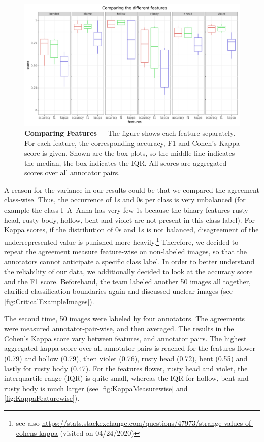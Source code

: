 \begin{figure}[!ht]
    \centering
    \includegraphics[scale=0.55]{Figures/chapter03/kappa_featurewise.png}
    \decoRule
    \caption[Feature-Wise Comparison of Agreement Measure Scores]{\textbf{Comparing Features}~~~The figure shows each feature separately. For each feature, the corresponding accuracy, F1 and Cohen’s Kappa score is given. Shown are the box-plots, so the middle line indicates the median, the box indicates the IQR. All scores are aggregated scores over all annotator pairs.}
    \label{fig:KappaFeaturewise}
\end{figure}

A reason for the variance in our results could be that we compared the agreement class-wise. Thus, the occurrence of 1s and 0s per class is very unbalanced (for example the class I~A~Anna has very few 1s because the binary features rusty head, rusty body, hollow, bent and violet are not present in this class label). For Kappa scores, if the distribution of 0s and 1s is not balanced, disagreement of the underrepresented value is punished more heavily.\footnote{see also \url{https://stats.stackexchange.com/questions/47973/strange-values-of-cohens-kappa} (visited on 04/24/2020)} Therefore, we decided to repeat the agreement measure feature-wise on non-labeled images, so that the annotators cannot anticipate a specific class label. In order to better understand the reliability of our data, we additionally decided to look at the accuracy score and the F1 score. Beforehand, the team labeled another 50 images all together, clarified classification boundaries again and discussed unclear images (see \autoref{fig:CriticalExampleImages}).

The second time, 50 images were labeled by four annotators. The agreements were measured annotator-pair-wise, and then averaged. The results in the Cohen’s Kappa score vary between features, and annotator pairs. The highest aggregated kappa score over all annotator pairs is reached for the features flower (0.79) and hollow (0.79), then violet (0.76), rusty head (0.72), bent (0.55) and lastly for rusty body (0.47).
For the features flower, rusty head and violet, the interquartile range (IQR) is quite small, whereas the IQR for hollow, bent and rusty body is much larger (see \autoref{fig:KappaMeasurewise} and \autoref{fig:KappaFeaturewise}).

